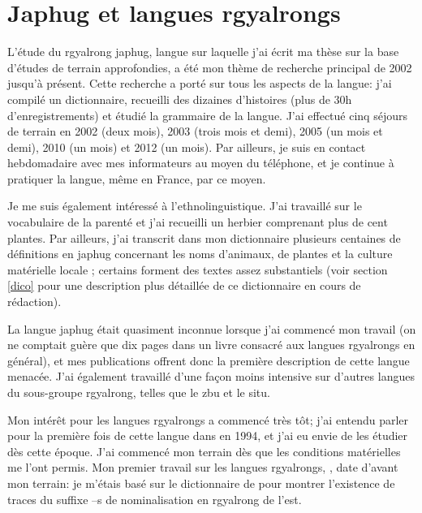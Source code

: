\documentclass[oldfontcommands,oneside,a4paper,11pt]{memoir}
\begin{document}
\section{Japhug et langues rgyalrongs}
	L’étude du rgyalrong japhug, langue sur laquelle j’ai écrit ma thèse sur la base d’études de terrain approfondies, a été mon thème de recherche principal de 2002 jusqu’à présent. Cette recherche a porté sur tous les aspects de la langue: j’ai compilé un dictionnaire, recueilli des dizaines d’histoires (plus de 30h d’enregistrements) et étudié la grammaire de la langue. J’ai effectué cinq séjours de terrain en 2002 (deux mois), 2003 (trois mois et demi), 2005 (un mois et demi), 2010 (un mois) et 2012 (un mois). Par ailleurs, je suis en contact hebdomadaire avec mes informateurs au moyen du téléphone, et je continue à pratiquer la langue, même en France, par ce moyen.
	
	
Je me suis également intéressé à l’ethnolinguistique. J’ai travaillé sur le vocabulaire de la parenté et j’ai recueilli un herbier comprenant plus de cent plantes. Par ailleurs, j’ai transcrit dans mon dictionnaire plusieurs centaines de définitions en japhug concernant les noms d’animaux, de plantes et la culture matérielle locale ; certains forment des textes assez substantiels   (voir section \ref{dico} pour une description plus détaillée de ce dictionnaire en cours de rédaction).

 La langue japhug était quasiment inconnue lorsque j’ai commencé mon travail (on ne comptait guère que dix pages dans un livre consacré aux langues rgyalrongs en général), et mes publications offrent donc la première description de cette langue menacée. J’ai également travaillé d’une façon moins intensive sur d’autres langues du sous-groupe rgyalrong, telles que le zbu et le situ. 

Mon intérêt pour les langues rgyalrongs a commencé très tôt; j'ai entendu parler pour la première fois de cette langue dans \citet{delancey87st} en 1994, et j'ai eu envie de les étudier   dès cette époque. J'ai commencé mon terrain dès que les conditions matérielles me l'ont permis. Mon premier travail sur les langues rgyalrongs, \citet{jacques03s.houzhui}, date d'avant mon terrain: je m'étais basé sur le dictionnaire de \citet{huangsun02} pour montrer l'existence de traces du suffixe --s de nominalisation en rgyalrong de l'est.


\begin{newicktree}
  \small \label{fig:stammbaum}
  \setunitlength{15cm} \righttree \nobranchlengths \nodelabelformat{}
  \par %
\end{newicktree}
\end{document}
